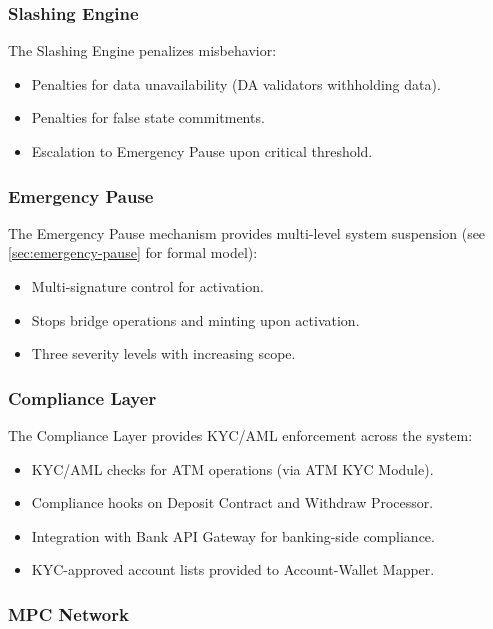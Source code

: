 \documentclass[12pt,a4paper]{article}
\theoremstyle{definition}
\theoremstyle{remark}
\begin{document}
\subsubsection{Slashing Engine}

The Slashing Engine penalizes misbehavior:
\begin{itemize}[nosep]
    \item Penalties for data unavailability (DA validators withholding data).
    \item Penalties for false state commitments.
    \item Escalation to Emergency Pause upon critical threshold.
\end{itemize}

\subsubsection{Emergency Pause}

The Emergency Pause mechanism provides multi-level system suspension (see \cref{sec:emergency-pause} for formal model):
\begin{itemize}[nosep]
    \item Multi-signature control for activation.
    \item Stops bridge operations and minting upon activation.
    \item Three severity levels with increasing scope.
\end{itemize}

\subsubsection{Compliance Layer}

The Compliance Layer provides KYC/AML enforcement across the system:
\begin{itemize}[nosep]
    \item KYC/AML checks for ATM operations (via ATM KYC Module).
    \item Compliance hooks on Deposit Contract and Withdraw Processor.
    \item Integration with Bank API Gateway for banking-side compliance.
    \item KYC-approved account lists provided to Account-Wallet Mapper.
\end{itemize}

\subsubsection{MPC Network}
\label{sec:mpc-network}
\end{document}
